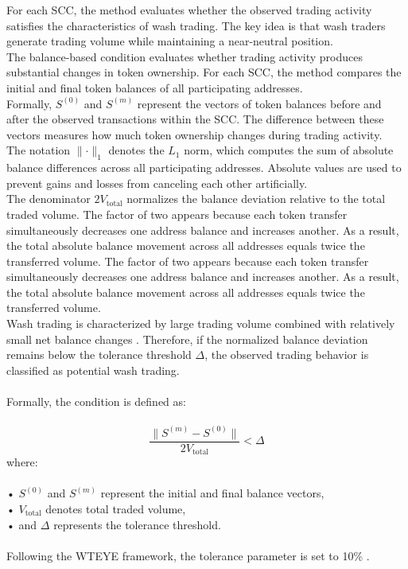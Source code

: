 \documentclass[language=english,thesis=bachelor,nosecondtitle,faculty=cb,onesided,13pt]{hsmw-thesis}
\begin{document}
For each SCC, the method evaluates whether the observed trading activity satisfies the characteristics of wash trading. The key idea is that wash traders generate trading volume while maintaining a near-neutral position.\\
The balance-based condition evaluates whether trading activity produces substantial changes in token ownership. For each SCC, the method compares the initial and final token balances of all participating addresses.\\
Formally, $S^{(0)}$ and $S^{(m)}$ represent the vectors of token balances before and after the observed transactions within the SCC. The difference between these vectors measures how much token ownership changes during trading activity.\\
The notation $\lVert \cdot \rVert_1$  denotes the $L_1$  norm, which computes the sum of absolute balance differences across all participating addresses. Absolute values are used to prevent gains and losses from canceling each other artificially.\\
The denominator $2V_{\text{total}}$ normalizes the balance deviation relative to the total traded volume. The factor of two appears because each token transfer simultaneously decreases one address balance and increases another. As a result, the total absolute balance movement across all addresses equals twice the transferred volume. The factor of two appears because each token transfer simultaneously decreases one address balance and increases another. As a result, the total absolute balance movement across all addresses equals twice the transferred volume.\\
Wash trading is characterized by large trading volume combined with relatively small net balance changes \cite{cui2023chain}. Therefore, if the normalized balance deviation remains below the tolerance threshold $\Delta$, the observed trading behavior is classified as potential wash trading.\\
\\
Formally, the condition is defined as:\\
\\
\begin{equation}
    \frac{\lVert S^{(m)} - S^{(0)} \rVert}{2V_{\text{total}}} < \Delta
    \label{eq:volume_bound}
\end{equation}
where:\\
\\
•	$S^{(0)}$ and $S^{(m)}$  represent the initial and final balance vectors,\\
•	$V_{\text{total}}$  denotes total traded volume,\\
•	and $\Delta$ represents the tolerance threshold.\\
\\
Following the WTEYE framework, the tolerance parameter is set to 10\% \cite{cui2023chain}.
\end{document}
